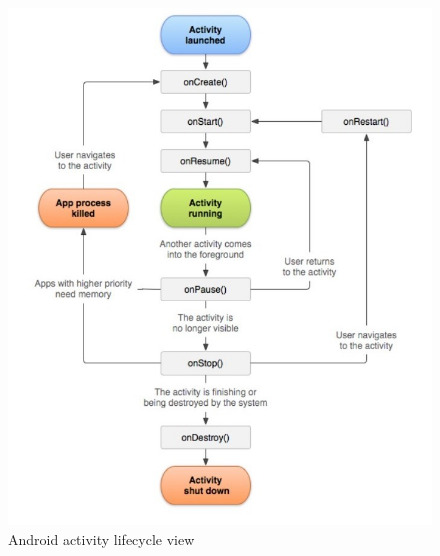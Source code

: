 \begin{figure}[!ht]
\centering
\includegraphics[width =1.0\textwidth]{img/activity_lifecycle.png}
\caption{\label{fig:activity_lifecycle}Android activity lifecycle
view }
\end{figure}